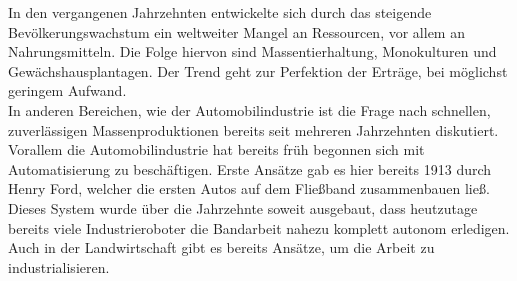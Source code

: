 	In den vergangenen Jahrzehnten entwickelte sich durch das steigende Bevölkerungswachstum ein weltweiter Mangel an Ressourcen, vor allem an Nahrungsmitteln. Die Folge hiervon sind Massentierhaltung, Monokulturen und Gewächshausplantagen. Der Trend geht zur Perfektion der Erträge, bei möglichst geringem Aufwand.\\
	In anderen Bereichen, wie der Automobilindustrie ist die Frage nach schnellen, zuverlässigen Massenproduktionen bereits seit mehreren Jahrzehnten diskutiert. Vorallem die Automobilindustrie hat bereits früh begonnen sich mit Automatisierung zu beschäftigen. Erste Ansätze gab es hier bereits 1913 durch Henry Ford, welcher die ersten Autos auf dem Fließband zusammenbauen ließ. Dieses System wurde über die Jahrzehnte soweit ausgebaut, dass heutzutage bereits viele Industrieroboter die Bandarbeit nahezu komplett autonom erledigen.\\
	Auch in der Landwirtschaft gibt es bereits Ansätze, um die Arbeit zu industrialisieren.